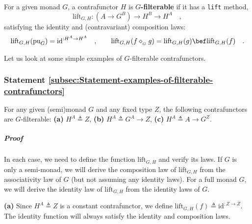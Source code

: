 For a given monad $G$, a contrafunctor $H$ is $G$\textbf{-filterable}
if it has a \lstinline!lift! method,
\[
\text{lift}_{G,H}:(A\rightarrow G^{B})\rightarrow H^{B}\rightarrow H^{A}\quad,
\]
satisfying the identity and (contravariant) composition laws:
\[
\text{lift}_{G,H}(\text{pu}_{G})=\text{id}^{:H^{A}\rightarrow H^{A}}\quad,\quad\quad\text{lift}_{G,H}(f\diamond_{_{G}}g)=\text{lift}_{G,H}(g)\bef\text{lift}_{G,H}(f)\quad.
\]

Let us look at some simple examples of $G$-filterable contrafunctors.

\subsubsection{Statement \label{subsec:Statement-examples-of-filterable-contrafunctors}\ref{subsec:Statement-examples-of-filterable-contrafunctors}}

For any given (semi)monad $G$ and any fixed type $Z$, the following
contrafunctors are $G$-filterable: \textbf{(a)} $H^{A}\triangleq Z$,
\textbf{(b)} $H^{A}\triangleq G^{A}\rightarrow Z$, \textbf{(c)} $H^{A}\triangleq A\rightarrow G^{Z}$.

\subparagraph{Proof}

In each case, we need to define the function $\text{lift}_{G,H}$
and verify its laws. If $G$ is only a semi-monad, we will derive
the composition law of $\text{lift}_{G,H}$ from the associativity
law of $G$ (but not assuming any identity laws). For a full monad
$G$, we will derive the identity law of $\text{lift}_{G,H}$ from
the identity laws of $G$. 

\textbf{(a)} Since $H^{A}\triangleq Z$ is a constant contrafunctor,
we define $\text{lift}_{G,H}(f)\triangleq\text{id}^{:Z\rightarrow Z}$.
The identity function will always satisfy the identity and composition
laws.

